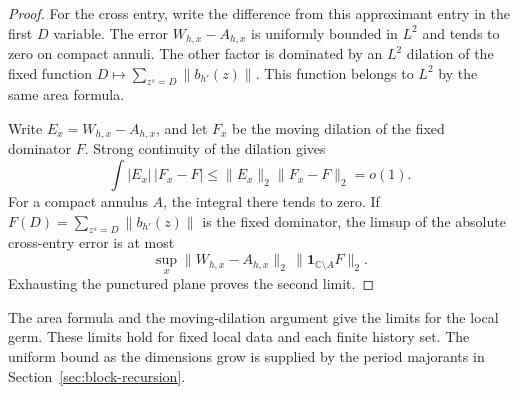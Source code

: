 \begin{proof}

For the cross entry, write the difference from this
approximant entry in the first \(D\) variable. The error
\(W_{h,x}-A_{h,x}\) is uniformly bounded in \(L^2\) and
tends to zero on compact annuli. The other factor is
dominated by an \(L^2\) dilation of the fixed function
\(D\mapsto\sum_{z^s=D}\|b_{h'}(z)\|\). This function belongs to
\(L^2\) by the same area formula.

Write \(E_x=W_{h,x}-A_{h,x}\), and let \(F_x\) be the moving
dilation of the fixed dominator \(F\). Strong continuity of the dilation gives
\[
 \int |E_x|\,|F_x-F|\le \|E_x\|_2\|F_x-F\|_2=o(1).
\] For a compact annulus \(A\), the integral there tends to zero.
If \(F(D)=\sum_{z^s=D}\|b_{h'}(z)\|\) is the fixed dominator,
the limsup of the absolute cross-entry error is at most
\[
  \sup_x\|W_{h,x}-A_{h,x}\|_2\,\|\mathbf 1_{\mathbb C\setminus A}F\|_2 .
\]
Exhausting the punctured plane proves the second limit.
\end{proof}

 The area formula and the moving-dilation argument give the limits for the local germ. These limits hold for fixed local
data and each finite history set. The uniform bound as
the dimensions grow is supplied by the period majorants in
Section~\ref{sec:block-recursion}. \label{cor:orbital-germ-2}
